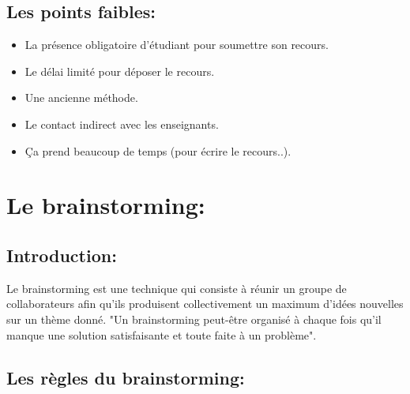 \documentclass[12pt]{report}
\begin{document}
\subsection{Les points faibles:}
\begin{itemize}
    \item La présence obligatoire d'étudiant pour soumettre son recours.
    \item Le délai limité pour déposer le recours.
    \item Une ancienne méthode.
    \item Le contact indirect avec les enseignants.
    \item Ça prend beaucoup de temps (pour écrire le recours..).
\end{itemize}

\section{Le brainstorming:}

\subsection{Introduction:}
\hspace{0.12in}
Le brainstorming est une technique qui consiste à réunir un groupe de collaborateurs afin qu'ils produisent collectivement un maximum d'idées nouvelles sur un thème donné. "Un brainstorming peut-être organisé à chaque fois qu'il manque une solution satisfaisante et toute faite à un problème".

\newpage

\subsection{Les règles du brainstorming:}
\end{document}
